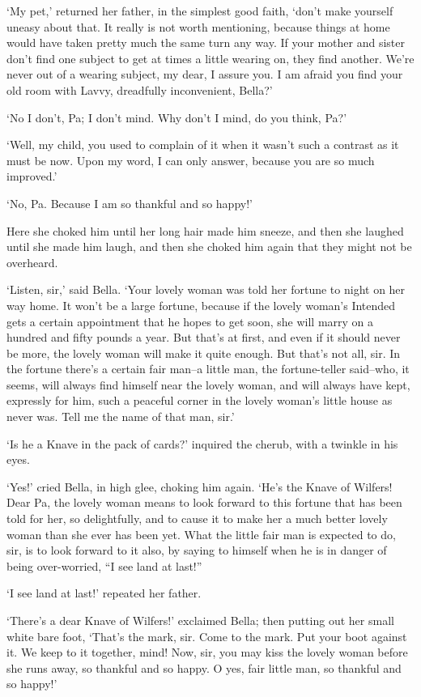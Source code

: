 ‘My pet,’ returned her father, in the simplest good faith, ‘don’t make
yourself uneasy about that. It really is not worth mentioning, because
things at home would have taken pretty much the same turn any way. If
your mother and sister don’t find one subject to get at times a little
wearing on, they find another. We’re never out of a wearing subject,
my dear, I assure you. I am afraid you find your old room with Lavvy,
dreadfully inconvenient, Bella?’

‘No I don’t, Pa; I don’t mind. Why don’t I mind, do you think, Pa?’

‘Well, my child, you used to complain of it when it wasn’t such a
contrast as it must be now. Upon my word, I can only answer, because you
are so much improved.’

‘No, Pa. Because I am so thankful and so happy!’

Here she choked him until her long hair made him sneeze, and then she
laughed until she made him laugh, and then she choked him again that
they might not be overheard.

‘Listen, sir,’ said Bella. ‘Your lovely woman was told her fortune
to night on her way home. It won’t be a large fortune, because if the
lovely woman’s Intended gets a certain appointment that he hopes to get
soon, she will marry on a hundred and fifty pounds a year. But that’s at
first, and even if it should never be more, the lovely woman will make
it quite enough. But that’s not all, sir. In the fortune there’s a
certain fair man--a little man, the fortune-teller said--who, it seems,
will always find himself near the lovely woman, and will always have
kept, expressly for him, such a peaceful corner in the lovely woman’s
little house as never was. Tell me the name of that man, sir.’

‘Is he a Knave in the pack of cards?’ inquired the cherub, with a
twinkle in his eyes.

‘Yes!’ cried Bella, in high glee, choking him again. ‘He’s the Knave of
Wilfers! Dear Pa, the lovely woman means to look forward to this fortune
that has been told for her, so delightfully, and to cause it to make her
a much better lovely woman than she ever has been yet. What the little
fair man is expected to do, sir, is to look forward to it also, by
saying to himself when he is in danger of being over-worried, “I see
land at last!”

‘I see land at last!’ repeated her father.

‘There’s a dear Knave of Wilfers!’ exclaimed Bella; then putting out her
small white bare foot, ‘That’s the mark, sir. Come to the mark. Put your
boot against it. We keep to it together, mind! Now, sir, you may kiss
the lovely woman before she runs away, so thankful and so happy. O yes,
fair little man, so thankful and so happy!’



